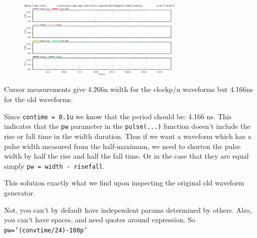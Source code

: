 \documentclass{article}
\begin{document}
\begin{figure}[h]
    \centering
    \includegraphics[width=0.7\textwidth]{misaligned_clocks_0.01n.png}
\end{figure}

Cursor measurements give 4.266n width for the clockp/n waveforms but 4.166ns for the old waveforms.

Since \texttt{contime = 0.1u} we know that the period should be: 4.166 ns. This indicates that the \texttt{pw} parameter in the \texttt{pulse(...)} function doesn't include the rise or fall time in the width duration. Thus if we want a waveform which has a pulse width measured from the half-maximum, we need to shorten the pulse width by half the rise and half the fall time. Or in the case that they are equal simply \texttt{pw = width - risefall}.

This solution exactly what we find upon inspecting the original old waveform generator.

Not, you can't by default have independent params determined by others. Also, you can't have spaces, and need quotes around expression. So \texttt{pw='(convtime/24)-100p'}
\end{document}
